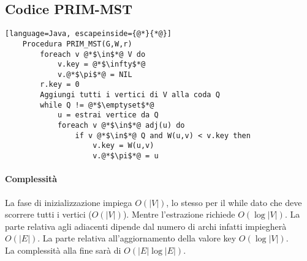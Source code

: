 \subsection{Codice PRIM-MST}
\begin{lstlisting}[language=Java, escapeinside={@*}{*@}]
    Procedura PRIM_MST(G,W,r)
        foreach v @*$\in$*@ V do
            v.key = @*$\infty$*@
            v.@*$\pi$*@ = NIL
        r.key = 0
        Aggiungi tutti i vertici di V alla coda Q
        while Q != @*$\emptyset$*@
            u = estrai vertice da Q
            foreach v @*$\in$*@ adj(u) do
                if v @*$\in$*@ Q and W(u,v) < v.key then
                    v.key = W(u,v)
                    v.@*$\pi$*@ = u
\end{lstlisting}
\paragraph*{Complessità} La fase di inizializzazione impiega $O(|V|)$, lo stesso
per il while dato che deve scorrere tutti i vertici ($O(|V|)$). Mentre l'estrazione
richiede $O(\log |V|)$. La parte relativa agli adiacenti dipende dal numero di archi
infatti impiegherà $O(|E|)$. La parte relativa all'aggiornamento della valore key 
$O(\log |V|)$.\\
La complessità alla fine sarà di $O(|E|\log |E|)$.


